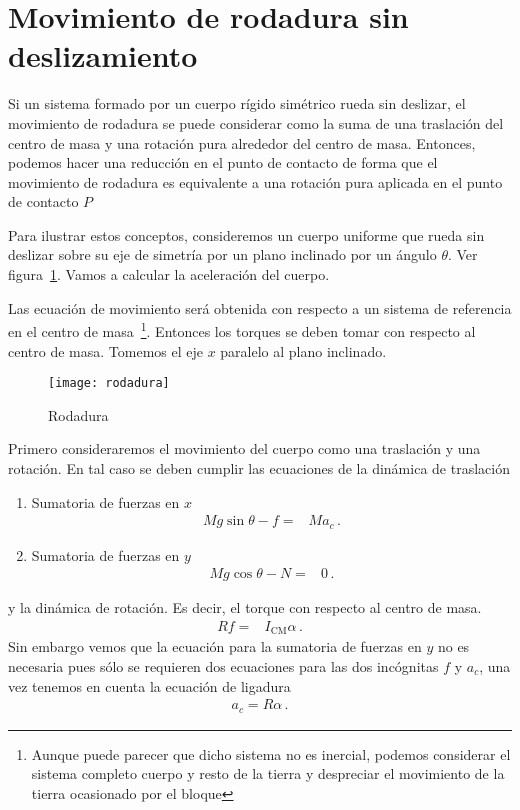 \section{Movimiento de rodadura sin deslizamiento}

Si un sistema formado por un cuerpo rígido simétrico rueda sin
deslizar, el movimiento de rodadura se puede considerar como la suma de
una traslación del centro de masa y una rotación pura alrededor del
centro de masa. 
Entonces, podemos hacer una reducción en el punto de contacto de forma
que el movimiento de rodadura es equivalente a una rotación pura
aplicada en el punto de contacto $P$



Para ilustrar estos conceptos, consideremos un cuerpo uniforme que
rueda sin deslizar sobre su eje de simetría por un plano inclinado por
un ángulo $\theta$. Ver figura~\ref{fig:rodadura}. Vamos a calcular la aceleración del cuerpo.

Las ecuación de movimiento será obtenida con respecto a un sistema de
referencia en el centro de masa~\footnote{Aunque puede parecer que
  dicho sistema no es inercial, podemos considerar el sistema completo
  cuerpo y resto de la tierra y despreciar el movimiento de la tierra
  ocasionado por el bloque}. 
Entonces los torques se deben tomar con respecto al centro de
masa. Tomemos el eje $x$ paralelo al plano inclinado. 

\begin{frame}
\begin{figure}
  \centering
  \texttt{[image: rodadura]}
  \caption{Rodadura}
  \label{fig:rodadura}
\end{figure}
\end{frame}

Primero consideraremos el movimiento del cuerpo como una traslación y
una rotación. En tal caso se deben cumplir las ecuaciones de la
dinámica de traslación
\begin{enumerate}
\item Sumatoria de fuerzas en $x$ 
  \begin{align}
    \label{eq:fxcil}
    Mg\sin\theta-f=&M a_c\,.
  \end{align}
\item Sumatoria de fuerzas en $y$
  \begin{align*}
    Mg\cos\theta-N=&0\,.
  \end{align*}
\end{enumerate}
y la dinámica de rotación. Es decir, el torque con respecto al centro de masa. 
\begin{align}
  \label{eq:tcmcil}
  Rf=&I_{\text{CM}}\alpha\,.
\end{align}
Sin embargo vemos que la ecuación para la sumatoria de fuerzas en $y$
no es necesaria pues sólo se requieren dos ecuaciones para las dos
incógnitas $f$ y $a_c$, una vez tenemos en cuenta la ecuación de
ligadura
\begin{align}
  \label{eq:acal}
  a_c=R\alpha\,.
\end{align}

